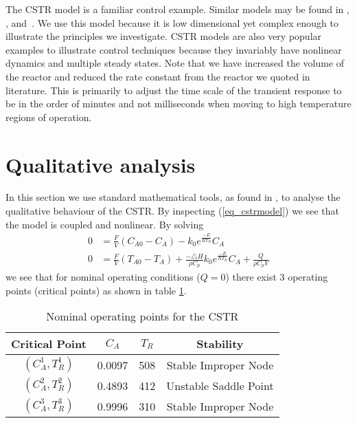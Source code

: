 The CSTR model is a familiar control example. Similar models may be found in \cite{du}, \cite{cervantes}, \cite{pan} and~\cite{yazdi}. We use this model because it is low dimensional yet complex enough to illustrate the principles we investigate. CSTR models are also very popular examples to illustrate control techniques because they invariably have nonlinear dynamics and multiple steady states. Note that we have increased the volume of the reactor and reduced the rate constant from the reactor we quoted in literature. This is primarily to adjust the time scale of the transient response to be in the order of minutes and not milliseconds when moving to high temperature regions of operation.

\section{Qualitative analysis}
In this section we use standard mathematical tools, as found in \cite{edwardsandpenny}, to analyse the qualitative behaviour of the CSTR. By inspecting (\ref{eq_cstrmodel}) we see that the model is coupled and nonlinear. By solving
\begin{equation}
\begin{aligned}
0 &= \frac{F}{V}\left( C_{A0}-C_A \right) - k_0e^{\frac{-E}{RT_R}}C_A \\
0 &= \frac{F}{V}\left(T_{A0}-T_A\right) + \frac{-\triangle H}{\rho C_p}k_0e^{\frac{-E}{RT_R}}C_A + \frac{Q}{\rho C_p V}
\end{aligned}
\label{eq_cstr_statpoints}
\end{equation}
we see that for nominal operating conditions ($Q = 0$) there exist 3 operating points (critical points) as shown in table \ref{tab_nominalstats}.
\begin{table}[H]
\begin{center}
\begin{tabular}{c c c c}
\hline
Critical Point & $C_A$ & $T_R$ & Stability\\
\hline
$\left(C_A^1, T_R^1\right)$ & 0.0097 & 508 & Stable Improper Node\\
$\left(C_A^2, T_R^2\right)$ & 0.4893 & 412 & Unstable Saddle Point \\
$\left(C_A^3, T_R^3 \right)$ & 0.9996 & 310 & Stable Improper Node \\
\hline
\end{tabular}
\caption{Nominal operating points for  the CSTR}
\label{tab_nominalstats}
\end{center}
\end{table}
